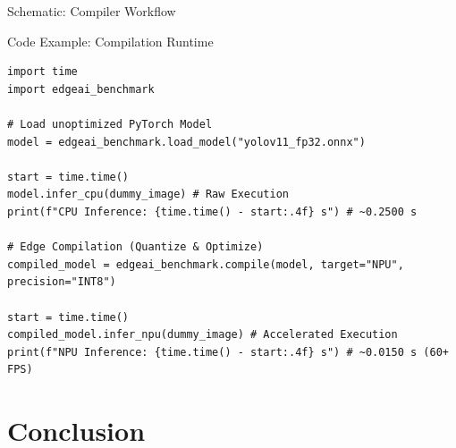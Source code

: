 \documentclass[aspectratio=169]{beamer}
\begin{document}
\begin{frame}{Schematic: Compiler Workflow}
    \begin{center}
    \end{center}
\end{frame}

\begin{frame}[fragile]{Code Example: Compilation Runtime}
    \begin{lstlisting}
import time
import edgeai_benchmark

# Load unoptimized PyTorch Model
model = edgeai_benchmark.load_model("yolov11_fp32.onnx")

start = time.time()
model.infer_cpu(dummy_image) # Raw Execution
print(f"CPU Inference: {time.time() - start:.4f} s") # ~0.2500 s

# Edge Compilation (Quantize & Optimize)
compiled_model = edgeai_benchmark.compile(model, target="NPU", precision="INT8")

start = time.time()
compiled_model.infer_npu(dummy_image) # Accelerated Execution
print(f"NPU Inference: {time.time() - start:.4f} s") # ~0.0150 s (60+ FPS)
    \end{lstlisting}
\end{frame}

\section{Conclusion}
\end{document}
